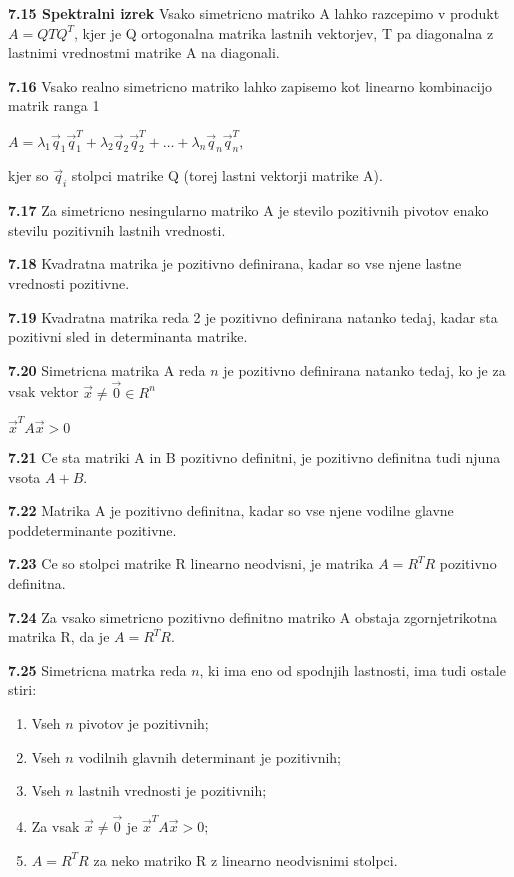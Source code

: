 \documentclass{article}
\begin{document}
\begin{multicols}{2}
\textbf{7.15 Spektralni izrek} Vsako simetricno matriko A lahko razcepimo v produkt
$A = QTQ^{T}$, kjer je Q ortogonalna matrika lastnih vektorjev, T pa diagonalna z lastnimi
vrednostmi matrike A na diagonali.

\textbf{7.16} Vsako realno simetricno matriko lahko zapisemo kot linearno kombinacijo matrik ranga 1
\begin{center}
    \begin{math}
        A = \lambda_{1}\vec{q}_{1}\vec{q}_{1}^{T} + \lambda_{2}\vec{q}_{2}\vec{q}_{2}^{T} +
        \dots + \lambda_{n}\vec{q}_{n}\vec{q}_{n}^{T} 
    \end{math},
\end{center}
kjer so $\vec{q}_{i}$ stolpci matrike Q (torej lastni vektorji matrike A).

\textbf{7.17} Za simetricno nesingularno matriko A je stevilo pozitivnih pivotov enako
stevilu pozitivnih lastnih vrednosti.

\textbf{7.18} Kvadratna matrika je pozitivno definirana, kadar so vse njene lastne vrednosti pozitivne.

\textbf{7.19} Kvadratna matrika reda 2 je pozitivno definirana natanko tedaj, kadar sta 
pozitivni sled in determinanta matrike.

\textbf{7.20} Simetricna matrika A reda $n$ je pozitivno definirana natanko tedaj, ko je za vsak
vektor $\vec{x} \neq \vec{0} \in R^{n}$
\begin{center}
    $\vec{x}^{T}A\vec{x} > 0$
\end{center}

\textbf{7.21} Ce sta matriki A in B pozitivno definitni, je pozitivno definitna tudi 
njuna vsota $A + B$.

\textbf{7.22} Matrika A je pozitivno definitna, kadar so vse njene vodilne glavne poddeterminante pozitivne.

\textbf{7.23} Ce so stolpci matrike R linearno neodvisni, je matrika $A = R^{T}R$ pozitivno definitna.

\textbf{7.24} Za vsako simetricno pozitivno definitno matriko A obstaja zgornjetrikotna matrika R, da
je $A = R^{T}R$.

\textbf{7.25} Simetricna matrka reda $n$, ki ima eno od spodnjih lastnosti, ima tudi ostale stiri:
\begin{enumerate}
    \item Vseh $n$ pivotov je pozitivnih;
    \item Vseh $n$ vodilnih glavnih determinant je pozitivnih;
    \item Vseh $n$ lastnih vrednosti je pozitivnih;
    \item Za vsak $\vec{x} \neq \vec{0}$ je $\vec{x}^{T}A\vec{x} > 0$;
    \item $A= R^{T}R$ za neko matriko R z linearno neodvisnimi stolpci.
\end{enumerate}


\end{multicols}
\end{document}

